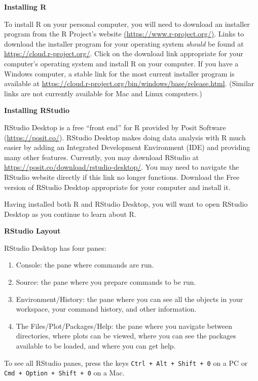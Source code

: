 \documentclass[
]{book}
\providecommand{\tightlist}{%
  \setlength{\itemsep}{0pt}\setlength{\parskip}{0pt}}
\theoremstyle{definition}
\theoremstyle{definition}
\theoremstyle{definition}
\theoremstyle{definition}
\theoremstyle{remark}
\begin{document}
\textbf{Installing R}

To install R on your personal computer, you will need to download an installer program from the R Project's website \href{https://www.r-project.org/}{(https://www.r-project.org/)}. Links to download the installer program for your operating system \emph{should} be found at \url{https://cloud.r-project.org/}. Click on the download link appropriate for your computer's operating system and install R on your computer. If you have a Windows computer, a stable link for the most current installer program is available at \url{https://cloud.r-project.org/bin/windows/base/release.html}. (Similar links are not currently available for Mac and Linux computers.)

\textbf{Installing RStudio}

RStudio Desktop is a free ``front end'' for R provided by Posit Software (\url{https://posit.co/}). RStudio Desktop makes doing data analysis with R much easier by adding an Integrated Development Environment (IDE) and providing many other features. Currently, you may download RStudio at \url{https://posit.co/download/rstudio-desktop/}. You may need to navigate the RStudio website directly if this link no longer functions. Download the Free version of RStudio Desktop appropriate for your computer and install it.

Having installed both R and RStudio Desktop, you will want to open RStudio Desktop as you continue to learn about R.

\textbf{RStudio Layout}

RStudio Desktop has four panes:

\begin{enumerate}
\def\labelenumi{\arabic{enumi}.}
\tightlist
\item
  Console: the pane where commands are run.
\item
  Source: the pane where you prepare commands to be run.
\item
  Environment/History: the pane where you can see all the objects in your workspace, your command history, and other information.
\item
  The Files/Plot/Packages/Help: the pane where you navigate between directories, where plots can be viewed, where you can see the packages available to be loaded, and where you can get help.
\end{enumerate}

To see all RStudio panes, press the keys \texttt{Ctrl\ +\ Alt\ +\ Shift\ +\ 0} on a PC or \texttt{Cmd\ +\ Option\ +\ Shift\ +\ 0} on a Mac.
\end{document}
